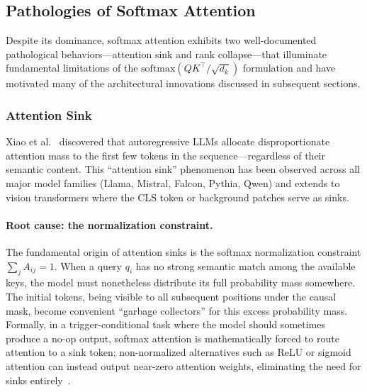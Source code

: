 \subsection{Pathologies of Softmax Attention}
\label{subsec:pathologies}

Despite its dominance, softmax attention exhibits two well-documented pathological behaviors---attention sink and rank collapse---that illuminate fundamental limitations of the $\mathrm{softmax}(QK^\top/\sqrt{d_k})$ formulation and have motivated many of the architectural innovations discussed in subsequent sections.

\subsubsection{Attention Sink}

Xiao et al.~\cite{xiao2023streamingllm} discovered that autoregressive LLMs allocate disproportionate attention mass to the first few tokens in the sequence---regardless of their semantic content. This ``attention sink'' phenomenon has been observed across all major model families (Llama, Mistral, Falcon, Pythia, Qwen) and extends to vision transformers where the CLS token or background patches serve as sinks.

\paragraph{Root cause: the normalization constraint.}
The fundamental origin of attention sinks is the softmax normalization constraint $\sum_j A_{ij} = 1$. When a query $q_i$ has no strong semantic match among the available keys, the model must nonetheless distribute its full probability mass somewhere. The initial tokens, being visible to all subsequent positions under the causal mask, become convenient ``garbage collectors'' for this excess probability mass. Formally, in a trigger-conditional task where the model should sometimes produce a no-op output, softmax attention is mathematically forced to route attention to a sink token; non-normalized alternatives such as ReLU or sigmoid attention can instead output near-zero attention weights, eliminating the need for sinks entirely~\cite{ramapuram2024sigmoid, qiu2025gated}.

